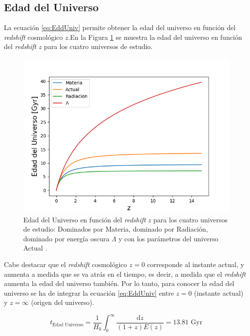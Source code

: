 \documentclass[twoside]{article}
\begin{document}
			\subsection{Edad del Universo}
				\label{sec:EddUniv}

				La ecuación \ref{eq:EddUniv} permite obtener la edad del universo en función del \textit{redshift} cosmológico $z$.En la Figura \ref{Img:EddUniv} se muestra la edad del universo en función del \textit{redshift} $z$ para los cuatro universos de estudio.

					\begin{figure}[H]
						\centering
						\includegraphics[scale=0.6]{edad_Universo.png}
						\caption{\label{Img:EddUniv}Edad del Universo en función del \textit{redshift} $z$ para los cuatro universos de estudio: Dominados por \textnormal{Materia}, dominado por \textnormal{Radiación}, dominado por energía oscura $\Lambda$ y con los parámetros del universo \textnormal{Actual} \cite{Plank}.}
					\end{figure}

				Cabe destacar que el \textit{redshift} cosmológico $z = 0$ corresponde al instante actual, y aumenta a medida que se va atrás en el tiempo, es decir, a medida que el \textit{redshift} aumenta la edad del universo también. Por lo tanto, para conocer la edad del universo se ha de integrar la ecuación \ref{eq:EddUniv} entre $z=0$ (instante actual) y $z=\infty$ (origen del universo).

					\begin{equation}
						t_{\textrm{Edad Universo}} = \frac{1}{H_0} \int_0^\infty \frac{\mathrm{d}z}{(1+z)E(z)} = 13.81 \textrm{ Gyr}
					\label{eq:EddUniv}
					\end{equation}
\end{document}
